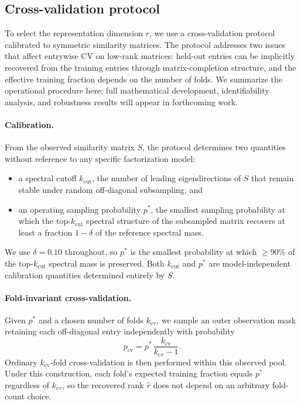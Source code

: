 \documentclass{article}
\begin{document}
\subsection{Cross-validation protocol}
\label{subsec:cv_protocol}
To select the representation dimension $r$, we use a cross-validation protocol calibrated to symmetric similarity matrices. The protocol addresses two issues that affect entrywise CV on low-rank matrices: held-out entries can be implicitly recovered from the training entries through matrix-completion structure, and the effective training fraction depends on the number of folds. We summarize the operational procedure here; full mathematical development, identifiability analysis, and robustness results will appear in forthcoming work.

\paragraph{Calibration.} From the observed similarity matrix $S$, the protocol determines two quantities without reference to any specific factorization model:
\begin{itemize}
\item a spectral cutoff $k_{\mathrm{cut}}$, the number of leading eigendirections of $S$ that remain stable under random off-diagonal subsampling, and
\item an operating sampling probability $p^*$, the smallest sampling probability at which the top-$k_{\mathrm{cut}}$ spectral structure of the subsampled matrix recovers at least a fraction $1-\delta$ of the reference spectral mass.
\end{itemize}
We use $\delta = 0.10$ throughout, so $p^*$ is the smallest probability at which $\geq 90\%$ of the top-$k_{\mathrm{cut}}$ spectral mass is preserved. Both $k_{\mathrm{cut}}$ and $p^*$ are model-independent calibration quantities determined entirely by $S$.

\paragraph{Fold-invariant cross-validation.} Given $p^*$ and a chosen number of folds $k_{\mathrm{cv}}$, we sample an outer observation mask retaining each off-diagonal entry independently with probability
\begin{equation}
p_{\mathrm{cv}} = p^*\,\frac{k_{\mathrm{cv}}}{k_{\mathrm{cv}} - 1}.
\label{eq:fold_invariant_p}
\end{equation}
Ordinary $k_{\mathrm{cv}}$-fold cross-validation is then performed within this observed pool. Under this construction, each fold's expected training fraction equals $p^*$ regardless of $k_{\mathrm{cv}}$, so the recovered rank $\hat r$ does not depend on an arbitrary fold-count choice.
\end{document}
